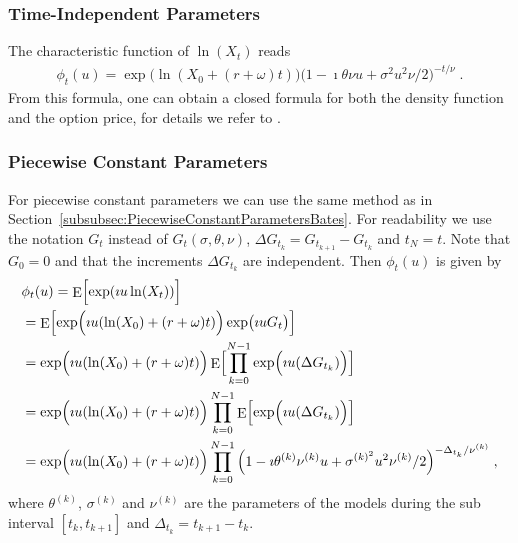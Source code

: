 \documentclass[10pt,a4paper]{article}
\numberwithin{equation}{section} %
\theoremstyle{plain}
\theoremstyle{definition}
\theoremstyle{remark}
\providecommand{\subsubsecref}[1]{Section~\ref{#1}}
\DeclareMathOperator{\Ex}{E}
\begin{document}
\subsubsection{Time-Independent Parameters}
\label{subsubsec:TimeIndependentParametersVG}

The characteristic function of $\ln(X_t)$ reads
\begin{align*}
\phi_t(u)=\exp\bigl(\ln(X_0+(r+\omega)t)\bigr)\bigl(1-\imath \theta\nu u+\sigma^2 u^2\nu/2\bigr)^{-t/\nu}\;.
\end{align*}
From this formula, one can obtain a closed formula for both the density function and the option price, for details we refer to \cite{MCC98}.

\subsubsection{Piecewise Constant Parameters}
\label{subsubsec:PiecewiseConstantParametersVG}

For piecewise constant parameters we can use the same method as in \subsubsecref{subsubsec:PiecewiseConstantParametersBates}. For readability we use the notation $G_t$ instead of $G_t(\sigma,\theta,\nu)$, $\Delta G_{t_k}=G_{t_{k+1}}-G_{t_k}$ and $t_N=t$. Note that $G_0=0$ and that the increments $\Delta G_{t_k}$ are independent. Then $\phi_t(u)$ is given by
\begin{align*}
&\phi_t(u)=\Ex\Bigl[\exp(\imath u\ln(X_t))\Bigr]\;\\
&=\Ex\Bigl[\exp\Bigl(\imath u(\ln(X_0)+(r+\omega)t)\Bigr)\exp\bigl(\imath uG_t\bigr)\Bigr]\;\\
&=\exp\Bigl(\imath u(\ln(X_0)+(r+\omega)t)\Bigr)\Ex\Bigl[\prod_{k=0}^{N-1}{\exp\Bigl(\imath u(\Delta G_{t_k})\Bigr)}\Bigr]\; \\
&=\exp\Bigl(\imath u(\ln(X_0)+(r+\omega)t)\Bigr)\prod_{k=0}^{N-1}{\Ex\Bigl[\exp\Bigl(\imath u(\Delta G_{t_k})\Bigr)\Bigr]}\; \\
&=\exp\Bigl(\imath u(\ln(X_0)+(r+\omega)t)\Bigr)\prod_{k=0}^{N-1}{\Bigl(1-\imath \theta^{(k)}\nu^{(k)} u+\sigma^{(k)^2} u^2\nu^{(k)}/2\Bigr)^{-\Delta_{t_k}/\nu^{(k)}}}\;,
\end{align*}
where $\theta^{(k)}$, $\sigma^{(k)}$ and $\nu^{(k)}$ are the parameters of the models during the sub interval $[t_k,t_{k+1}]$ and $\Delta_{t_k}=t_{k+1}-t_k$.
\end{document}
